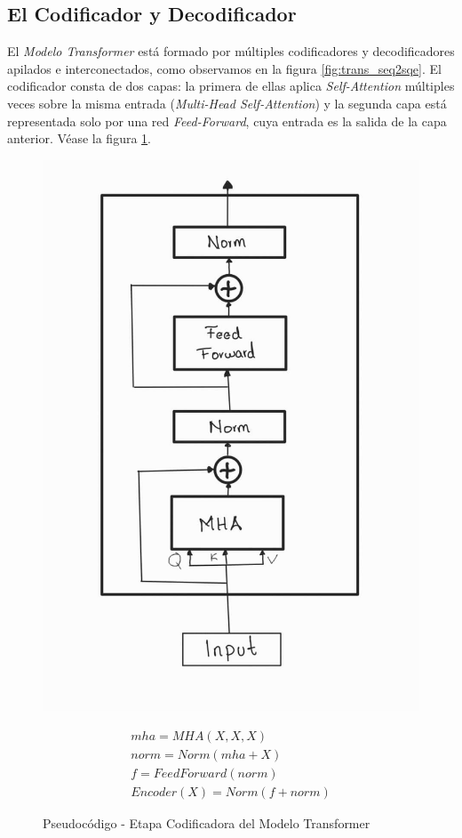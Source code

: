 \subsection{El Codificador y Decodificador}

El \textit{Modelo Transformer} está formado por múltiples codificadores y decodificadores apilados e
interconectados, como observamos en la figura \ref{fig:trans_seq2sqe}. El codificador consta de dos
capas: la primera de ellas aplica \textit{Self-Attention} múltiples veces sobre la misma entrada
(\textit{Multi-Head Self-Attention}) y la segunda capa está representada solo por una red
\textit{Feed-Forward}, cuya entrada es la salida de la capa anterior. Véase la figura \ref{fig:trans_encoder}.

\begin{figure}[ht!]
\centering
    \begin{minipage}{.4\textwidth}
        \centering
        \includegraphics[width=0.7 \textwidth]{Chapters/2. Transformer/Figures/transformer/encoder.jpg}
    \end{minipage}
    \begin{minipage}{.5\textwidth}
        \begin{equation*}
            \begin{split}
                mha = MHA(X, X, X)\\
                norm = Norm( mha + X)\\
                f = FeedForward(norm)\\
                Encoder(X) = Norm(f + norm)
            \end{split}
            \label{eq:trans_enc}
        \end{equation*}
    \end{minipage}
    \caption{Pseudocódigo - Etapa Codificadora del Modelo Transformer}
    \label{fig:trans_encoder}
\end{figure}


